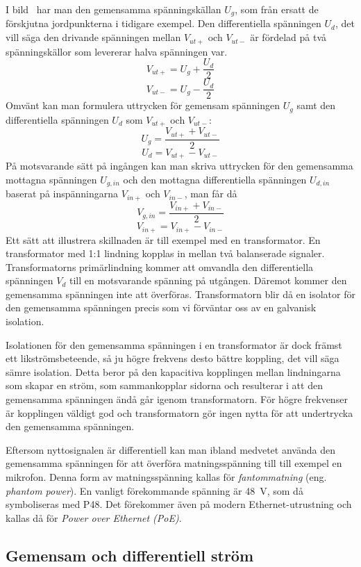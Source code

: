 I bild~ har man den gemensamma spänningskällan \(U_g\), som
från ersatt de förskjutna jordpunkterna i tidigare exempel.
Den differentiella spänningen \(U_d\), det vill säga den drivande spänningen
mellan \(V_{ut+}\) och  \(V_{ut-}\) är fördelad på två spänningskällor som
levererar halva spänningen var.
\[V_{ut+} = U_g + \dfrac{U_d}{2}\]
\[V_{ut-} = U_g - \dfrac{U_d}{2}\]
Omvänt kan man formulera uttrycken för gemensam spänningen \(U_g\) samt
den differentiella spänningen \(U_d\) som \(V_{ut+}\) och \(V_{ut-}\):
\[U_g = \dfrac{V_{ut+}+V_{ut-}}{2}\]
\[U_d = {V_{ut+}-V_{ut-}}\]
På motsvarande sätt på ingången kan man skriva uttrycken för den gemensamma
mottagna spänningen \(U_{g,in}\) och den mottagna differentiella spänningen
\(U_{d,in}\) baserat på inspänningarna \(V_{in+}\) och \(V_{in-}\), man får då
\[V_{g,in} = \dfrac{V_{in+} + V_{in-}}{2}\]
\[V_{in+} = V_{in+}-V_{in-}\]
Ett sätt att illustrera skillnaden är till exempel med en transformator.
En transformator med 1:1 lindning kopplas in mellan två balanserade signaler.
Transformatorns primärlindning kommer att omvandla den differentiella spänningen
\(V_d\) till en motsvarande spänning på utgången.
Däremot kommer den gemensamma spänningen inte att överföras.
Transformatorn blir då en isolator för den gemensamma spänningen precis som vi
förväntar oss av en galvanisk isolation.

Isolationen för den gemensamma spänningen i en transformator är dock främst ett
likströmsbeteende, så ju högre frekvens desto bättre koppling, det vill säga
sämre isolation.
Detta beror på den kapacitiva kopplingen mellan lindningarna som skapar en
ström, som sammankopplar sidorna och resulterar i att den gemensamma spänningen
ändå går igenom transformatorn.
För högre frekvenser är kopplingen väldigt god och transformatorn gör ingen
nytta för att undertrycka den gemensamma spänningen.

Eftersom nyttosignalen är differentiell kan man ibland medvetet använda den
gemensamma spänningen för att överföra matningsspänning till till exempel en
mikrofon.
Denna form av matningsspänning kallas för \emph{fantommatning}
(eng. \emph{phantom power}).
En vanligt förekommande spänning är \qty{48}{\volt}, som då symboliseras med P48.
Det förekommer även på modern Ethernet-utrustning och kallas då för
\emph{Power over Ethernet (PoE)}.

\subsection{Gemensam och differentiell ström}
\label{comdiffi}

